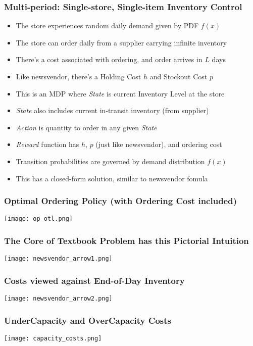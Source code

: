 \documentclass[handout]{beamer}
\begin{document}
\begin{frame}
\frametitle{Multi-period: Single-store, Single-item Inventory Control}
\pause
\begin{itemize}[<+->]
\item The store experiences random daily demand given by PDF $f(x)$
\item The store can order daily from a supplier carrying infinite inventory
\item There's a cost associated with ordering, and order arrives in $L$ days
\item Like newsvendor, there's a Holding Cost $h$ and Stockout Cost $p$
\item This is an MDP where {\em State} is current Inventory Level at the store
\item {\em State} also includes current in-transit inventory (from supplier)
\item {\em Action} is quantity to order in any given {\em State}
\item {\em Reward} function has $h$, $p$ (just like newsvendor), and ordering cost
\item Transition probabilities are governed by demand distribution $f(x)$
\item This has a closed-form solution, similar to newsvendor fomula
\end{itemize}
\end{frame}

\begin{frame}
\frametitle{Optimal Ordering Policy (with Ordering Cost included)}
\texttt{[image: op\_otl.png]}
\end{frame}


\begin{frame}
\frametitle{The Core of Textbook Problem has this Pictorial Intuition}
\texttt{[image: newsvendor\_arrow1.png]}
\end{frame}


\begin{frame}
\frametitle{Costs viewed against End-of-Day Inventory}
\texttt{[image: newsvendor\_arrow2.png]}
\end{frame}

\begin{frame}
\frametitle{UnderCapacity and OverCapacity Costs}
\texttt{[image: capacity\_costs.png]}
\end{frame}
\end{document}

